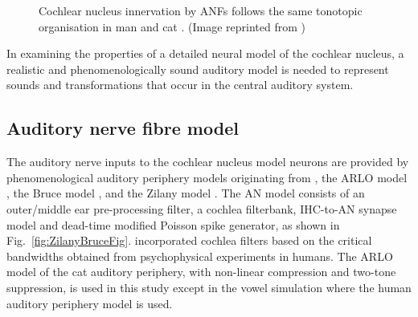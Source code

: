 
\begin{figure}[htb]
  \begin{center}
    \caption[Tonotopic innervation by ANFs in the CN of man and cat.]{Cochlear nucleus innervation by ANFs follows the same tonotopic organisation in man and cat
\citep{RyugoParks:2003,Ryugo:1992,Spoendlin:1973}. (Image reprinted from \citep{})}
    \label{fig:CN_Cat_Human}
  \end{center}
\end{figure}




%

In examining the properties of a detailed neural model of the cochlear nucleus, a realistic and phenomenologically sound auditory model is needed to represent sounds and transformations that occur in the central auditory system.

%

\subsection{Auditory nerve fibre model   \label{sec:CN:resp-audit-models}}

The auditory nerve inputs to the cochlear nucleus model neurons are provided by phenomenological auditory periphery models originating from \citet{Carney:1993},
the ARLO model \citep{HeinzZhangEtAl:2001}, the Bruce model \citep{BruceSachsEtAl:2003, ZilanyBruce:2006, ZilanyBruce:2007}, and the Zilany model \citep{ZilanyBruceEtAl:2009}.
The AN model consists of an outer\slash middle ear pre-processing filter, a cochlea filterbank, IHC-to-AN synapse model and dead-time modified Poisson spike generator, as shown in Fig.~\ref{fig:ZilanyBruceFig}.
\citet{HeinzZhangEtAl:2001} incorporated cochlea filters based on the critical bandwidths obtained from psychophysical experiments in humans.
The ARLO model of the cat auditory periphery, with non-linear compression and two-tone suppression, is used in this study except in the vowel simulation where the human auditory periphery model is used.

